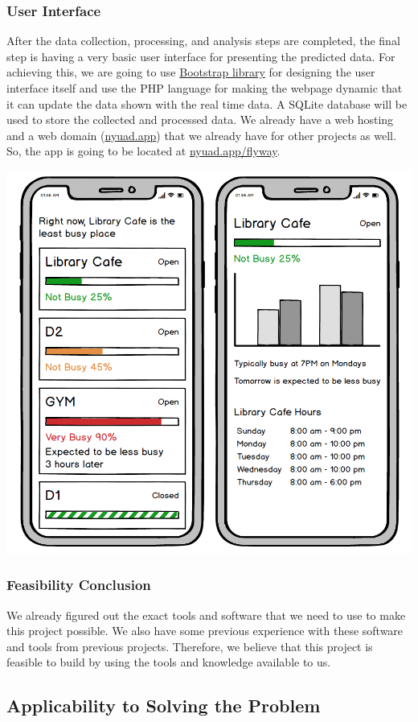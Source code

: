 \documentclass[journal, 12pt]{IEEEtran}
\begin{document}
\subsubsection{User Interface} 
After the data collection, processing, and analysis steps are completed, the final step is having a very basic user interface for presenting the predicted data. For achieving this, we are going to use \href{https://getbootstrap.com/}{Bootstrap library} for designing the user interface itself and use the PHP language for making the webpage dynamic that it can update the data shown with the real time data. A SQLite database will be used to store the collected and processed data. We already have a web hosting and a web domain (\href{https://nyuad.app/}{nyuad.app}) that we already have for other projects as well. So, the app is going to be located at \href{https://nyuad.app/flyway/}{nyuad.app/flyway}.

\begingroup
    \center
    \medskip
    \includegraphics[width=0.6\columnwidth]{report/interim_report/images/ux.png}
    \label{fig:ux}
    \medskip
\endgroup

\subsubsection{Feasibility Conclusion} 
We already figured out the exact tools and software that we need to use to make this project possible. We also have some previous experience with these software and tools from previous projects. Therefore, we believe that this project is feasible to build by using the tools and knowledge available to us.




\subsection{Applicability to Solving the Problem}





\printbibliography
\end{document}
